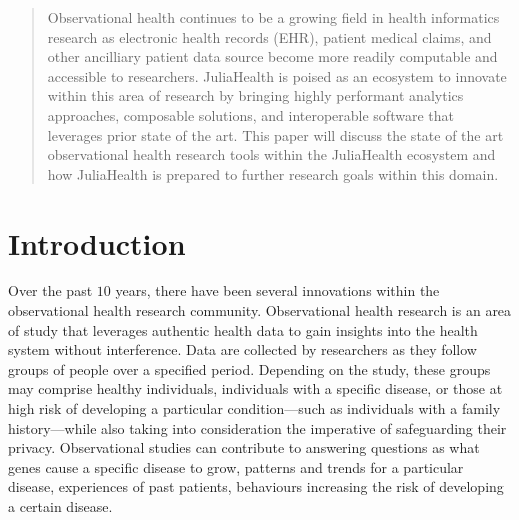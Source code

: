 \documentclass{juliacon}
\begin{document}


\maketitle

\begin{abstract}

Observational health continues to be a growing field in health informatics research as electronic health records (EHR), patient medical claims, and other ancilliary patient data source become more readily computable and accessible to researchers.
JuliaHealth is poised as an ecosystem to innovate within this area of research by bringing highly performant analytics approaches, composable solutions, and interoperable software that leverages prior state of the art. 
This paper will discuss the state of the art observational health research tools within the JuliaHealth ecosystem and how JuliaHealth is prepared to further research goals within this domain.

\end{abstract}

\section{Introduction}

Over the past $10$ years, there have been several innovations within the observational health research community.  Observational health research is an area of study that leverages authentic health data to gain insights into the health system without interference. Data are collected by researchers as they follow groups of people over a specified period. Depending on the study, these groups may comprise healthy individuals, individuals with a specific disease, or those at high risk of developing a particular condition—such as individuals with a family history—while also taking into consideration the imperative of safeguarding their privacy. Observational studies can contribute to answering questions as what genes cause a specific disease to grow, patterns and trends for a particular disease, experiences of past patients, behaviours increasing the risk of developing a certain disease. 
\end{document}
